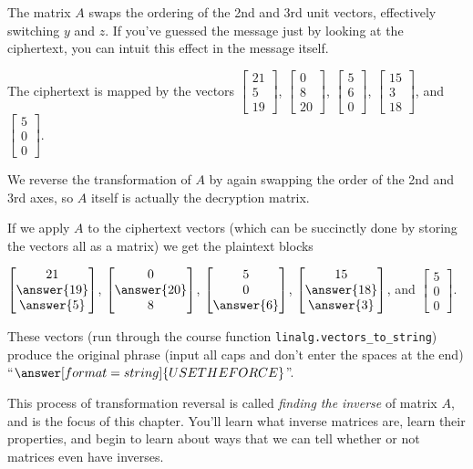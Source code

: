 \documentclass{ximera}
\begin{document}
\begin{solution}
  The matrix $A$ swaps the ordering of the 2nd and 3rd unit vectors, effectively switching $y$ and $z$. If you've guessed the message just by looking at the ciphertext, you can intuit this effect in the message itself.

  The ciphertext is mapped by the vectors $\begin{bmatrix}
    21 \\5\\19\end{bmatrix}$, $\begin{bmatrix}
    0 \\8\\20 \end{bmatrix}$, $\begin{bmatrix}
    5\\6\\0\end{bmatrix}$, $\begin{bmatrix}
    15\\3\\18\end{bmatrix}$, and $\begin{bmatrix}
    5\\0\\0\end{bmatrix}$.

  We reverse the transformation of $A$ by again swapping the order of the 2nd and 3rd axes, so $A$ itself is actually the decryption matrix.

  If we apply $A$ to the ciphertext vectors (which can be succinctly done by storing the vectors all as a matrix) we get the plaintext blocks 

  $\begin{bmatrix}
    21 \\\answer{19}\\\answer{5}\end{bmatrix}$, 
    $\begin{bmatrix}
    0 \\\answer{20}\\8\end{bmatrix}$, 
    $\begin{bmatrix}
    5\\0\\\answer{6}\end{bmatrix}$, 
    $\begin{bmatrix}
    15\\\answer{18}\\\answer{3}\end{bmatrix}$, 
    and $\begin{bmatrix}
    5\\0\\0\end{bmatrix}$.

  These vectors (run through the course function \texttt{linalg.vectors\_to\_string}) produce the original phrase (input all caps and don't enter the spaces at the end) ``$\answer[format=string]{USE THE FORCE}$''.

\end{solution}

This process of transformation reversal is called \emph{finding the inverse} of matrix $A$, and is the focus of this chapter. You'll learn what inverse matrices are, learn their properties, and begin to learn about ways that we can tell whether or not matrices even have inverses.
\end{document}
